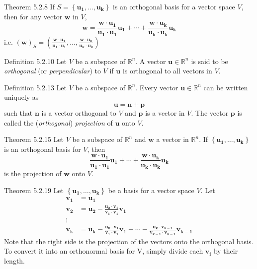 \documentclass[10pt,landscape]{article}
\newcommand{\vect}[1]{\bm{#1}}
\theoremstyle{definition}
\newcommand{\thistheoremname}{}
\newtheorem*{genericthm*}{\thistheoremname}
\newenvironment{namedthm*}[1]
{\renewcommand{\thistheoremname}{#1}\begin{genericthm*}}
{\end{genericthm*}}
\begin{document}
\begin{multicols}{3}
\begin{namedthm*}{Theorem 5.2.8}
    If \(S = \left\{\vect{u_1}, \dots, \vect{u_k}\right\}\) is an orthogonal basis for a vector space \(V\), then for any vector \(\vect{w}\) in \(V\),
    \[
    \vect{w} = \frac{\vect{w}\cdot\vect{u_1}}{\vect{u_1}\cdot\vect{u_1}}\vect{u_1} + \cdots + \frac{\vect{w}\cdot\vect{u_k}}{\vect{u_k}\cdot\vect{u_k}}\vect{u_k}
    \]
    i.e. \((\vect{w})_S = \left(\frac{\vect{w}\cdot\vect{u_1}}{\vect{u_1}\cdot\vect{u_1}}, \dots, \frac{\vect{w}\cdot\vect{u_k}}{\vect{u_k}\cdot\vect{u_k}}\right)\)
\end{namedthm*}


\begin{namedthm*}{Definition 5.2.10}
    Let \(V\) be a subspace of \(\mathbb{R}^n\). A vector \(\vect{u} \in \mathbb{R}^n\) is said to be \textit{orthogonal} (or \textit{perpendicular}) to \(V\) if \(\vect{u}\) is orthogonal to all vectors in \(V\).
\end{namedthm*}

\begin{namedthm*}{Definition 5.2.13}
    Let \(V\) be a subspace of \(\mathbb{R}^n\). Every vector \(\vect{u} \in \mathbb{R}^n\) can be written uniquely as
    \[
        \vect{u} = \vect{n} + \vect{p}
    \]
    such that \(\vect{n}\) is a vector orthogonal to \(V\) and \(\vect{p}\) is a vector in \(V\). The vector \(\vect{p}\) is called the (\textit{orthogonal}) \textit{projection} of \(\vect{u}\) onto \(V\).
\end{namedthm*}

\begin{namedthm*}{Theorem 5.2.15}
    Let \(V\) be a subspace of \(\mathbb{R}^n\) and \(\vect{w}\) a vector in \(\mathbb{R}^n\). If \(\left\{\vect{u_1}, \dots, \vect{u_k}\right\}\) is an orthogonal basis for \(V\), then
    \[
    \frac{\vect{w}\cdot\vect{u_1}}{\vect{u_1}\cdot\vect{u_1}}\vect{u_1} + \cdots + \frac{\vect{w}\cdot\vect{u_k}}{\vect{u_k}\cdot\vect{u_k}}\vect{u_k}
    \]
    is the projection of \(\vect{w}\) onto \(V\).
\end{namedthm*}

\begin{namedthm*}{Theorem 5.2.19}
    Let \(\left\{\vect{u_1}, \dots, \vect{u_k}\right\}\) be a basis for a vector space \(V\). Let
    \[
        \begin{aligned}
            \vect{v_1} &= \vect{u_1}\\
            \vect{v_2} &= \vect{u_2} - \frac{\vect{u_2}\cdot\vect{v_1}}{\vect{v_1}\cdot\vect{v_1}}\vect{v_1}\\
            \vdots\\
            \vect{v_k} &= \vect{u_k} - \frac{\vect{u_k}\cdot\vect{v_1}}{\vect{v_1}\cdot\vect{v_1}}\vect{v_1} - \cdots - \frac{\vect{u_k}\cdot\vect{v_{k - 1}}}{\vect{v_{k - 1}}\cdot\vect{v_{k - 1}}}\vect{v_{k - 1}}
        \end{aligned}
    \]
    Note that the right side is the projection of the vectors onto the orthogonal basis. To convert it into an orthonormal basis for V, simply divide each \(\vect{v_i}\) by their length.
\end{namedthm*}


\end{multicols}
\end{document}
